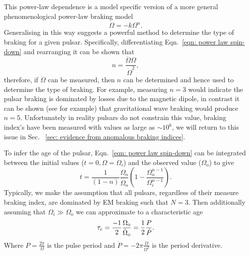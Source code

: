 This power-law dependence is a model specific version of a more general
phenomenological power-law braking model
\begin{equation}
    \dot{\Omega} = -k \Omega^{n}.
    \label{eqn: power law spin-down}
\end{equation}
Generalising in this way suggests a powerful method to determine the type of
braking for a given pulsar. Specifically, differentiating Eqn.~\eqref{eqn: power law spin-down}
and rearranging it can be shown that
\begin{equation}
    n = \frac{\ddot{\Omega}\Omega}{\dot{\Omega}^{2}},
    \label{eqn: measured braking index}
\end{equation}
therefore, if $\ddot{\Omega}$ can be measured, then $n$ can be determined and
hence used to determine the type of braking. For example, measuring $n=3$ would
indicate the pulsar braking is dominated by losses due to the magnetic dipole,
in contrast it can be shown (see \citet{Shapiro83} for example) that
gravitational wave braking would produce $n=5$. Unfortunately in reality
pulsars do not constrain this value, braking index's have been measured with
values as large as $\sim10^{6}$, we will return to this issue in Sec.~
\ref{sec: evidence from anomalous braking indices}.

To infer the age of the pulsar, Eqn.~\eqref{eqn: power law spin-down} can
be integrated between the initial values ($t=0, \Omega=\Omega_{i}$) and the
observed value ($\Omega_{\mathrm{o}}$) to give
\begin{equation}
    t = \frac{1}{(1-n)} \frac{\Omega_{\mathrm{o}}}{\dot\Omega_{\mathrm{o}}} 
        \left(1 - \frac{\Omega_{\mathrm{o}}^{n-1}}{\Omega_{i}^{n-1}}\right).
\label{eqn: characteristic age}
\end{equation}
Typically, we make the assumption that all
pulsars, regardless of their measure braking index, are dominated by EM braking
such that $N=3$. Then additionally assuming that $\Omega_{i} \gg
\Omega_{\mathrm{o}}$ we can approximate to a characteristic age
\begin{equation}
    \tau_c = \frac{-1}{2}\frac{\Omega_{\mathrm{o}}}{\dot\Omega_{\mathrm{o}}}
         = \frac{1}{2}\frac{P}{\dot{P}}.
\end{equation}
Where $P=\frac{2\pi}{\Omega}$ is the pulse period and
$\dot{P}=-2\pi\frac{\dot{\Omega}}{\Omega^{2}}$ is the period derivative.

